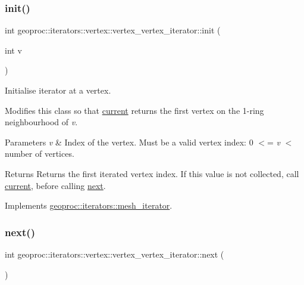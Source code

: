 \subsubsection{\texorpdfstring{init()}{init()}}
{\footnotesize\ttfamily int geoproc\+::iterators\+::vertex\+::vertex\+\_\+vertex\+\_\+iterator\+::init (\begin{DoxyParamCaption}\item[{int}]{v }\end{DoxyParamCaption})\hspace{0.3cm}{\ttfamily [virtual]}}



Initialise iterator at a vertex. 

Modifies this class so that \hyperlink{classgeoproc_1_1iterators_1_1vertex_1_1vertex__vertex__iterator_a3e1a4cd5c67b262156017489662ecabc}{current} returns the first vertex on the 1-\/ring neighbourhood of {\itshape v}.


\begin{DoxyParams}{Parameters}
{\em v} & Index of the vertex. Must be a valid vertex index\+: 0 $<$= {\itshape v} $<$ number of vertices. \\
\hline
\end{DoxyParams}
\begin{DoxyReturn}{Returns}
Returns the first iterated vertex index. If this value is not collected, call \hyperlink{classgeoproc_1_1iterators_1_1vertex_1_1vertex__vertex__iterator_a3e1a4cd5c67b262156017489662ecabc}{current}, before calling \hyperlink{classgeoproc_1_1iterators_1_1vertex_1_1vertex__vertex__iterator_ad2041720a1d35892804c659de7b2dd44}{next}. 
\end{DoxyReturn}


Implements \hyperlink{classgeoproc_1_1iterators_1_1mesh__iterator_a8a4d8b5c84941dd0a7cb7373abcd3fcc}{geoproc\+::iterators\+::mesh\+\_\+iterator}.

\mbox{\label{classgeoproc_1_1iterators_1_1vertex_1_1vertex__vertex__iterator_ad2041720a1d35892804c659de7b2dd44}} 
\subsubsection{\texorpdfstring{next()}{next()}}
{\footnotesize\ttfamily int geoproc\+::iterators\+::vertex\+::vertex\+\_\+vertex\+\_\+iterator\+::next (\begin{DoxyParamCaption}{ }\end{DoxyParamCaption})\hspace{0.3cm}{\ttfamily [virtual]}}



